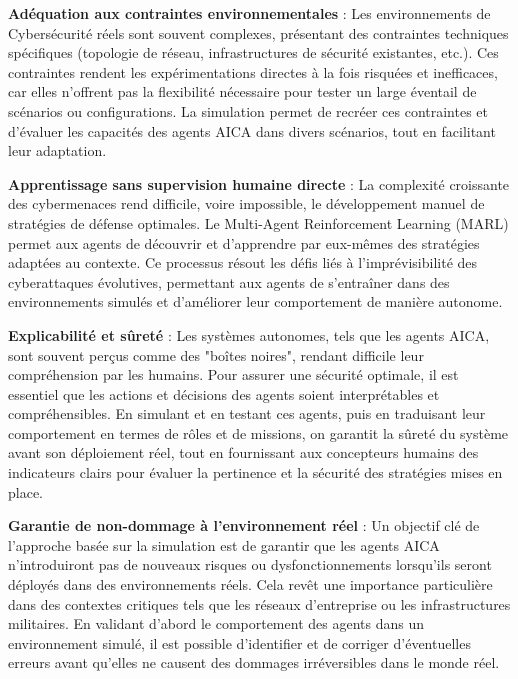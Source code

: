 \textbf{Adéquation aux contraintes environnementales} : Les environnements de Cybersécurité réels sont souvent complexes, présentant des contraintes techniques spécifiques (topologie de réseau, infrastructures de sécurité existantes, etc.). Ces contraintes rendent les expérimentations directes à la fois risquées et inefficaces, car elles n'offrent pas la flexibilité nécessaire pour tester un large éventail de scénarios ou configurations. La simulation permet de recréer ces contraintes et d'évaluer les capacités des agents AICA dans divers scénarios, tout en facilitant leur adaptation.

\textbf{Apprentissage sans supervision humaine directe} : La complexité croissante des cybermenaces rend difficile, voire impossible, le développement manuel de stratégies de défense optimales. Le Multi-Agent Reinforcement Learning (MARL) permet aux agents de découvrir et d'apprendre par eux-mêmes des stratégies adaptées au contexte. Ce processus résout les défis liés à l'imprévisibilité des cyberattaques évolutives, permettant aux agents de s'entraîner dans des environnements simulés et d'améliorer leur comportement de manière autonome.

\textbf{Explicabilité et sûreté} : Les systèmes autonomes, tels que les agents AICA, sont souvent perçus comme des "boîtes noires", rendant difficile leur compréhension par les humains. Pour assurer une sécurité optimale, il est essentiel que les actions et décisions des agents soient interprétables et compréhensibles. En simulant et en testant ces agents, puis en traduisant leur comportement en termes de rôles et de missions, on garantit la sûreté du système avant son déploiement réel, tout en fournissant aux concepteurs humains des indicateurs clairs pour évaluer la pertinence et la sécurité des stratégies mises en place.

\textbf{Garantie de non-dommage à l'environnement réel} : Un objectif clé de l'approche basée sur la simulation est de garantir que les agents AICA n'introduiront pas de nouveaux risques ou dysfonctionnements lorsqu'ils seront déployés dans des environnements réels. Cela revêt une importance particulière dans des contextes critiques tels que les réseaux d'entreprise ou les infrastructures militaires. En validant d'abord le comportement des agents dans un environnement simulé, il est possible d'identifier et de corriger d'éventuelles erreurs avant qu'elles ne causent des dommages irréversibles dans le monde réel.

\vspace{0.5cm}

